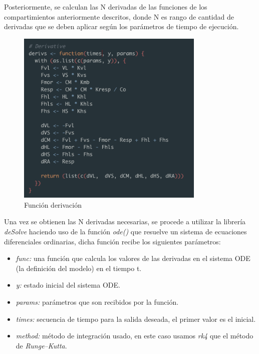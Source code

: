Posteriormente, se calculan las N derivadas de las funciones de los compartimientos anteriormente descritos, donde N es rango de cantidad de derivadas que se deben aplicar seg\'un los par\'ametros de tiempo de ejecuci\'on.\\

\begin{figure}[H]
  \centering
    \begin{minipage}{0.8\textwidth}
      \centering
      \includegraphics[width=0.8\textwidth]{figure_4_11.png}
      \caption{Funci\'on derivaci\'on}
      \label{fig:Fig}
    \end{minipage}%
    \hspace{5mm}
\end{figure}

Una vez se obtienen las N derivadas necesarias, se procede a utilizar la librer\'ia \textit{deSolve} haciendo uso de la funci\'on \textit{ode()} que resuelve un sistema de ecuaciones diferenciales ordinarias, dicha funci\'on recibe los siguientes par\'ametros: \\

\begin{itemize}
  \item \textit{func:} una funci\'on que calcula los valores de las derivadas en el sistema ODE (la definici\'on del modelo) en el tiempo t.
  \item \textit{y:} estado inicial del sistema ODE.
  \item \textit{params:} par\'ametros que son recibidos por la funci\'on.
  \item \textit{times:} secuencia de tiempo para la salida deseada, el primer valor es el inicial.
  \item \textit{method:} m\'etodo de integraci\'on usado, en este caso usamos \textit{rk4} que el m\'etodo de \textit{Runge–Kutta}.
\end{itemize}

